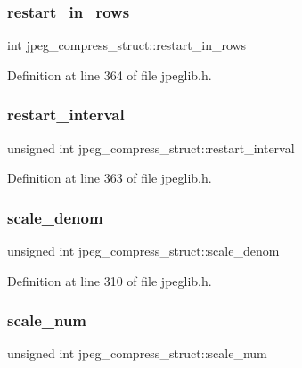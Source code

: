 \subsubsection{\texorpdfstring{restart\_in\_rows}{restart\_in\_rows}}
{\footnotesize\ttfamily int jpeg\+\_\+compress\+\_\+struct\+::restart\+\_\+in\+\_\+rows}



Definition at line 364 of file jpeglib.\+h.

\mbox{\label{structjpeg__compress__struct_a57ad1f6d9015e25fe272c645dcc3f71e}} 
\subsubsection{\texorpdfstring{restart\_interval}{restart\_interval}}
{\footnotesize\ttfamily unsigned int jpeg\+\_\+compress\+\_\+struct\+::restart\+\_\+interval}



Definition at line 363 of file jpeglib.\+h.

\mbox{\label{structjpeg__compress__struct_ab30f569483d6c25032aa2c18c885e91c}} 
\subsubsection{\texorpdfstring{scale\_denom}{scale\_denom}}
{\footnotesize\ttfamily unsigned int jpeg\+\_\+compress\+\_\+struct\+::scale\+\_\+denom}



Definition at line 310 of file jpeglib.\+h.

\mbox{\label{structjpeg__compress__struct_a16eb7e2e1ac30c42e8bd753bde43129c}} 
\subsubsection{\texorpdfstring{scale\_num}{scale\_num}}
{\footnotesize\ttfamily unsigned int jpeg\+\_\+compress\+\_\+struct\+::scale\+\_\+num}




